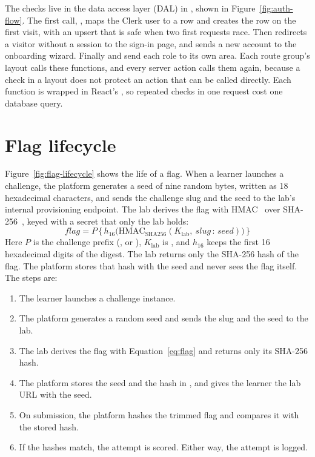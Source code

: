 The checks live in the data access layer (DAL) in , shown in Figure~\ref{fig:auth-flow}. The first call, , maps the Clerk user to a  row and creates the row on the first visit, with an upsert that is safe when two first requests race. Then  redirects a visitor without a session to the sign-in page, and  sends a new account to the onboarding wizard. Finally  and  send each role to its own area. Each route group's layout calls these functions, and every server action calls them again, because a check in a layout does not protect an action that can be called directly. Each function is wrapped in React's , so repeated checks in one request cost one database query.


\section{Flag lifecycle}
\label{sec:flag-lifecycle}

Figure~\ref{fig:flag-lifecycle} shows the life of a flag. When a learner launches a challenge, the platform generates a seed of nine random bytes, written as 18 hexadecimal characters, and sends the challenge slug and the seed to the lab's internal provisioning endpoint. The lab derives the flag with HMAC~\cite{Krawczyk1997hmac} over SHA-256~\cite{Nist2015shs}, keyed with a secret that only the lab holds:
\begin{equation}
\label{eq:flag}
\mathit{flag} = P\,\{\, h_{16}\big(\mathrm{HMAC}_{\mathrm{SHA256}}(K_{\mathrm{lab}},\ \mathit{slug}\,{:}\,\mathit{seed})\big) \,\}
\end{equation}
Here $P$ is the challenge prefix (,  or ), $K_{\mathrm{lab}}$ is , and $h_{16}$ keeps the first 16 hexadecimal digits of the digest. The lab returns only the SHA-256 hash of the flag. The platform stores that hash with the seed and never sees the flag itself. The steps are:

\begin{enumerate}[leftmargin=2em]
\item The learner launches a challenge instance.
\item The platform generates a random seed and sends the slug and the seed to the lab.
\item The lab derives the flag with Equation~\eqref{eq:flag} and returns only its SHA-256 hash.
\item The platform stores the seed and the hash in , and gives the learner the lab URL with the seed.
\item On submission, the platform hashes the trimmed flag and compares it with the stored hash.
\item If the hashes match, the attempt is scored. Either way, the attempt is logged.
\end{enumerate}

